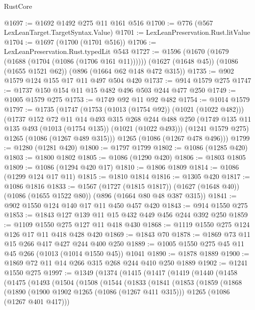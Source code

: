 \begin{lexlean}{RustCore}
\begin{coremodule}
@1697 := @1692 @1492 @275 @11 @161 @516
@1700 := @776 (@567 LexLeanTarget.TargetSyntax.Value)
@1701 := LexLeanPreservation.Rust.litValue
@1704 := @1697 (@1700 (@1701 @516))
@1706 := LexLeanPreservation.Rust.typedLit @543
@1727 := @1596
    (@1670 (@1679 (@1688 (@1704 (@1086 (@1706 @161 @11))))))
    (@1627 (@1648 @45))
    (@1086 (@1655 @1521 @62))
    (@896 (@1664 @62 @148 @472 @315))
@1735 := @902 @1579 @124 @155 @17 @11 @497 @504 @420
@1737 := @914 @1579 @275
@1747 := @1737 @150 @154 @11 @15 @482 @496 @503 @244 @477 @250
@1749 := @1005 @1579 @275
@1753 := @1749 @92 @11 @92 @482
@1754 := @1014 @1579
@1797 := @1735
    (@1747
      (@1753 (@1013 (@1754 @92)) (@1021 (@1022 @482)))
      (@1737
        @152
        @72
        @11
        @14
        @493
        @315
        @268
        @244
        @488
        @250
        (@1749 @135 @11 @135 @493 (@1013 (@1754 @135)) (@1021 (@1022 @493)))
        (@1241 @1579 @275)
        @1265
        (@1086 (@1267 @489 @315)))
      @1265
      (@1086 (@1267 @478 @496)))
@1799 := @1280 (@1281 @420)
@1800 := @1797 @1799
@1802 := @1086 (@1285 @420)
@1803 := @1800 @1802
@1805 := @1086 (@1290 @420)
@1806 := @1803 @1805
@1809 := @1086 (@1294 @420 @17)
@1810 := @1806 @1809
@1814 := @1086 (@1299 @124 @17 @11)
@1815 := @1810 @1814
@1816 := @1305 @420
@1817 := @1086 @1816
@1833 := @1567
    (@1727 (@1815 @1817))
    (@1627 (@1648 @40))
    (@1086 (@1655 @1522 @80))
    (@896 (@1664 @80 @48 @387 @315))
@1841 := @902 @1550 @124 @140 @17 @11 @450 @457 @420
@1843 := @914 @1550 @275
@1853 := @1843 @127 @139 @11 @15 @432 @449 @456 @244 @392 @250
@1859 := @1109 @1550 @275 @127 @11 @418 @430
@1868 := @1119 @1550 @275 @124 @126 @17 @11 @418 @428 @420
@1869 := @1843 @70
@1878 := @1869 @73 @11 @15 @266 @417 @427 @244 @400 @250
@1889 := @1005 @1550 @275 @45 @11 @45 @266 (@1013 (@1014 @1550 @45)) @1041
@1890 := @1878 @1889
@1900 := @1869 @72 @11 @14 @266 @315 @268 @244 @410 @250 @1889
@1902 := @1241 @1550 @275
@1997 := @1349
    (@1374
      (@1415
        (@1417
          (@1419
            (@1440
              (@1458
                (@1475
                  (@1493
                    (@1504
                      (@1508
                        (@1544
                          (@1833
                            (@1841
                              (@1853
                                (@1859
                                  (@1868
                                    (@1890
                                      (@1900 @1902 @1265 (@1086 (@1267 @411 @315)))
                                      @1265
                                      (@1086 (@1267 @401 @417)))

\end{coremodule}
\end{lexlean}
